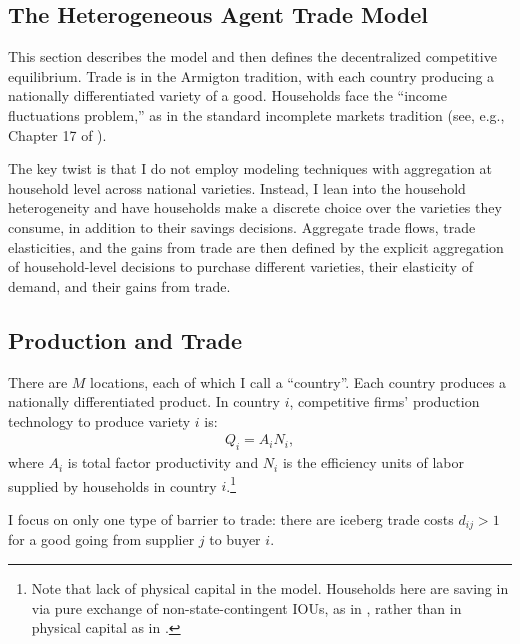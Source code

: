\documentclass[12pt,pdftex]{article}
\begin{document}
\begin{onehalfspacing}
\section{The Heterogeneous Agent Trade Model}

This section describes the model and then defines the decentralized competitive equilibrium. Trade is in the Armigton tradition, with each country producing a nationally differentiated variety of a good. Households face the ``income fluctuations problem,'' as in the standard incomplete markets tradition (see, e.g., Chapter 17 of \citet{ljungqvist2012recursive}).

The key twist is that I do not employ modeling techniques with aggregation at household level across national varieties. Instead, I lean into the household heterogeneity and have households make a discrete choice over the varieties they consume, in addition to their savings decisions. Aggregate trade flows, trade elasticities, and the gains from trade are then defined by the explicit aggregation of household-level decisions to purchase different varieties, their elasticity of demand, and their gains from trade.

\subsection{Production and Trade}\label{sec:trade}

There are $M$ locations, each of which I call a ``country''. Each country produces a nationally differentiated product. In country $i$, competitive firms' production technology to produce variety $i$ is:
\begin{align}
Q_i = A_i N_i,
\label{eq:production}
\end{align}
where $A_i$ is total factor productivity and $N_i$ is the efficiency units of labor supplied by households in country $i$.\footnote{Note that lack of physical capital in the model. Households here are saving in via pure exchange of non-state-contingent IOUs, as in \citet{huggett1993risk}, rather than in physical capital as in \citet{aiyagari1994uninsured}.}

I focus on only one type of barrier to trade: there are iceberg trade costs $d_{ij} > 1$ for a good going from supplier $j$ to buyer $i$.


\end{onehalfspacing}
\end{document}
